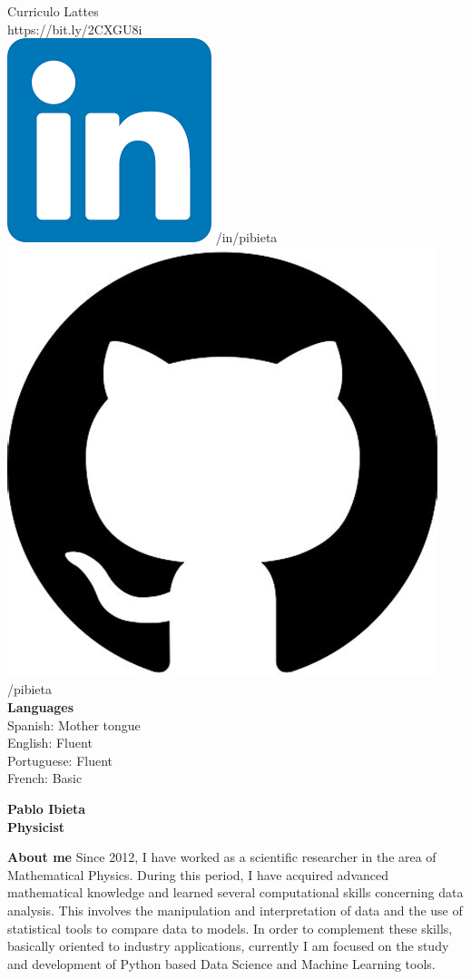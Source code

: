 \documentclass[a4paper,12pt,final]{memoir}
\newcommand{\Sep}{\vspace{1.5em}}
\newenvironment{AboutMe}
	{\ignorespaces\textbf{\color{RoyalBlue} About me}}
	{\Sep\ignorespacesafterend}
\begin{document}
\begin{flushleft}
	\vspace{1mm}
	Curriculo Lattes \\
	\vspace{1mm}
	https://bit.ly/2CXGU8i\\
	\vspace{1mm}
    \includegraphics[width=0.07\columnwidth]{in_icon.png} /in/pibieta \\
    \vspace{1mm}
    \includegraphics[width=0.07\columnwidth]{git.jpeg} /pibieta \\
    \vspace{1mm}
    \vspace{4mm}
	\textbf{Languages}\\
	\vspace{1mm}
	Spanish: Mother tongue\\
	\vspace{1mm}
	English: Fluent\\
	\vspace{1mm}
	Portuguese: Fluent\\
	\vspace{1mm}
	French: Basic
	\vspace{1mm}
\end{flushleft}\normalsize


\framebreak



\Huge\bfseries {\color{RoyalBlue} Pablo Ibieta} \\
\Large\bfseries Physicist \\

\normalsize\normalfont

\begin{AboutMe}
Since 2012, I have worked as a scientific researcher in the area of Mathematical Physics. During this period, I have acquired advanced mathematical knowledge and learned several computational skills concerning data analysis. This involves the manipulation and interpretation of data and the use of statistical tools to compare data to models. In order to complement these skills, basically oriented to industry applications, currently I am focused on the study and development of Python based Data Science and Machine Learning tools. 
\end{AboutMe}
 
\end{document}

